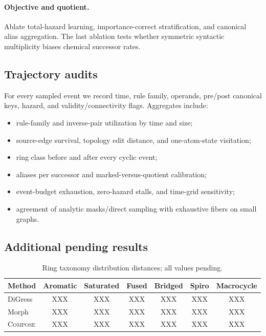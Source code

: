\documentclass{article}
\newcommand{\method}{\textsc{Compose}\xspace}
\theoremstyle{definition}
\theoremstyle{remark}
\begin{document}
\paragraph{Objective and quotient.}
Ablate total-hazard learning, importance-correct stratification, and canonical alias aggregation. The last ablation tests whether symmetric syntactic multiplicity biases chemical successor rates.

\subsection{Trajectory audits}

For every sampled event we record time, rule family, operands, pre/post canonical keys, hazard, and validity/connectivity flags. Aggregates include:
\begin{itemize}[leftmargin=*]
    \item rule-family and inverse-pair utilization by time and size;
    \item source-edge survival, topology edit distance, and one-atom-state visitation;
    \item ring class before and after every cyclic event;
    \item aliases per successor and marked-versus-quotient calibration;
    \item event-budget exhaustion, zero-hazard stalls, and time-grid sensitivity;
    \item agreement of analytic masks/direct sampling with exhaustive fibers on small graphs.
\end{itemize}

\subsection{Additional pending results}

\begin{table}[h]
\centering
\caption{Ring taxonomy distribution distances; all values pending.}
\small
\begin{tabular}{lcccccc}
\toprule
Method & Aromatic & Saturated & Fused & Bridged & Spiro & Macrocycle\\
\midrule
DiGress & XXX & XXX & XXX & XXX & XXX & XXX\\
Morph & XXX & XXX & XXX & XXX & XXX & XXX\\
\method & XXX & XXX & XXX & XXX & XXX & XXX\\
\bottomrule
\end{tabular}
\end{table}
\end{document}
